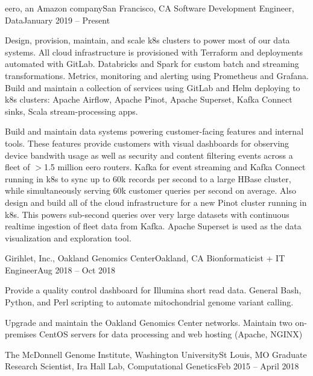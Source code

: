 \resumeSubheading
{eero, an Amazon company}{San Francisco, CA}
{Software Development Engineer, Data}{January 2019 -- Present}

\resumeItemListStart

{Design, provision, maintain, and scale k8s clusters to power most of our data systems. All cloud infrastructure is provisioned with Terraform and deployments automated with GitLab. Databricks and Spark for custom batch and streaming transformations. Metrics, monitoring and alerting using Prometheus and Grafana. Build and maintain a collection of services using GitLab and Helm deploying to k8s clusters: Apache Airflow, Apache Pinot, Apache Superset, Kafka Connect sinks, Scala stream-processing apps.}

{Build and maintain data systems powering customer-facing features and internal tools. These features provide customers with visual dashboards for observing device bandwith usage as well as security and content filtering events across a fleet of $>$1.5 million eero routers. Kafka for event streaming and Kafka Connect running in k8s to sync up to 60k records per second to a large HBase cluster, while simultaneously serving 60k customer queries per second on average. Also design and build all of the cloud infrastructure for a new Pinot cluster running in k8s. This powers sub-second queries over very large datasets with continuous realtime ingestion of fleet data from Kafka. Apache Superset is used as the data visualization and exploration tool.}

\resumeItemListEnd


\resumeSubheading
{Girihlet, Inc., Oakland Genomics Center}{Oakland, CA}
{Bionformaticist + IT Engineer}{Aug 2018 -- Oct 2018}

\resumeItemListStart

{Provide a quality control dashboard for Illumina short read data. General Bash, Python, and Perl scripting to automate mitochondrial genome variant calling.}

{Upgrade and maintain the Oakland Genomics Center networks. Maintain two on-premises CentOS servers for data processing and web hosting (Apache, NGINX)}

\resumeItemListEnd


\resumeSubheading
{The McDonnell Genome Institute, Washington University}{St Louis, MO}
{Graduate Research Scientist, Ira Hall Lab, Computational Genetics}{Feb 2015 -- April 2018}

